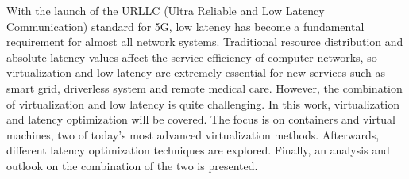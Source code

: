 With the launch of the URLLC (Ultra Reliable and Low Latency Communication) standard for 5G,
low latency has become a fundamental requirement for almost all network systems.
Traditional resource distribution and absolute latency values affect the service efficiency
of computer networks, so virtualization and low latency are extremely essential for new services
such as smart grid, driverless system and remote medical care.
However, the combination of virtualization and low latency is quite challenging.
In this work, virtualization and latency optimization will be covered.
The focus is on containers and virtual machines, two of today's most advanced virtualization methods.
Afterwards, different latency optimization techniques are explored.
Finally, an analysis and outlook on the combination of the two is presented.